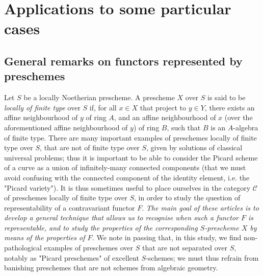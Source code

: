 \section{Applications to some particular cases}\label{fga3.ii-c}

\subsection{General remarks on functors represented by preschemes}\label{fga3.ii-c.1}

Let $S$ be a locally Noetherian prescheme.
A prescheme $X$ over $S$ is said to be \emph{locally of finite type} over $S$ if, for all $x\in X$ that project to $y\in Y$, there exists an affine neighbourhood of $y$ of ring $A$, and an affine neighbourhood of $x$ (over the aforementioned affine neighbourhood of $y$) of ring $B$, such that $B$ is an $A$-algebra of finite type.
There are many important examples of preschemes locally of finite type over $S$, that are not of finite type over $S$, given by solutions of classical universal problems;
thus it is important to be able to consider the Picard scheme of a curve as a union of infinitely-many connected components (that we must avoid confusing with the connected component of the identity element, i.e. the "Picard variety").
It is thus sometimes useful to place ourselves in the category $\mathcal{C}$ of preschemes locally of finite type over $S$, in order to study the question of representability of a contravariant functor $F$.
\emph{The main goal of these articles is to develop a general technique that allows us to recognise when such a functor $F$ is representable, and to study the properties of the corresponding $S$-prescheme $X$ by means of the properties of $F$.}
We note in passing that, in this study, we find non-pathological examples of preschemes over $S$ that are not separated over $S$, notably as "Picard preschemes" of excellent $S$-schemes;
we must thus refrain from banishing preschemes that are not schemes from algebraic geometry.

